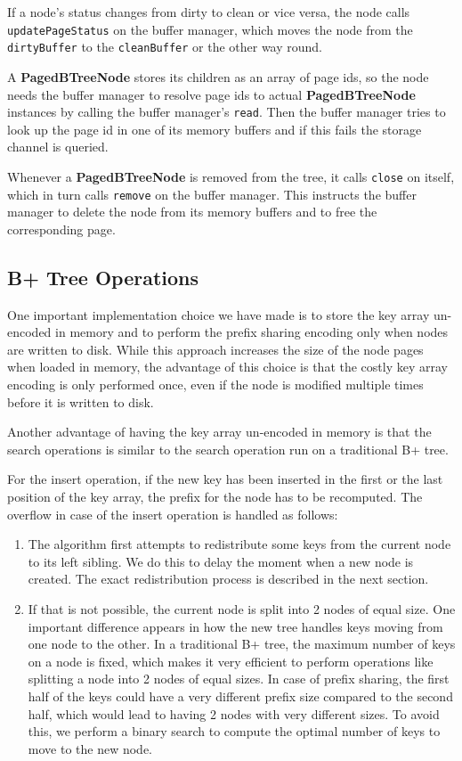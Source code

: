 \documentclass[11pt,a4paper,oneside]{article}
\begin{document}
If a node's status changes from dirty to clean or vice versa, the node calls \texttt{updatePageStatus} on the buffer manager, 
which moves the node from the \texttt{dirtyBuffer} to the \texttt{cleanBuffer} or the other way round.

A \textbf{PagedBTreeNode} stores its children as an array of page ids, 
so the node needs the buffer manager to resolve page ids to actual \textbf{PagedBTreeNode} instances by calling the buffer manager's \texttt{read}.
Then the buffer manager tries to look up the page id in one of its memory buffers and if this fails the storage channel is queried.

Whenever a \textbf{PagedBTreeNode} is removed from the tree, it calls \texttt{close} on itself, which in turn calls \texttt{remove} on the buffer manager.
This instructs the buffer manager to delete the node from its memory buffers and to free the corresponding page.

\subsection{B+ Tree Operations} %
\label{sub:b_tree_operations}
One important implementation choice we have made is to store the key array un-encoded in memory and to perform the prefix sharing encoding only when nodes are written to disk. While this approach increases the size of the node pages when loaded in memory, the advantage of this choice is that the costly key array encoding is only performed once, even if the node is modified multiple times before it is written to disk. 

Another advantage of having the key array un-encoded in memory is that the search operations is similar to the search operation run on a traditional B+ tree. 

For the insert operation, if the new key has been inserted in the first or the last position of the key array, the prefix for the node has to be recomputed. The overflow in case of the insert operation is handled as follows:
\begin{enumerate}
	\item The algorithm first attempts to redistribute some keys from the current node to its left sibling. We do this to delay the moment when a new node is created. The exact redistribution process is described in the next section.
	\item If that is not possible, the current node is split into 2 nodes of equal size. One important difference appears in how the new tree handles keys moving from one node to the other. In a traditional B+ tree, the maximum number of keys on a node is fixed, which makes it very efficient to perform operations like splitting a node into 2 nodes of equal sizes. In case of prefix sharing, the first half of the keys could have a very different prefix size compared to the second half, which would lead to having 2 nodes with very different sizes. To avoid this, we perform a binary search to compute the optimal number of keys to move to the new node.
\end{enumerate}
	
\end{document}
